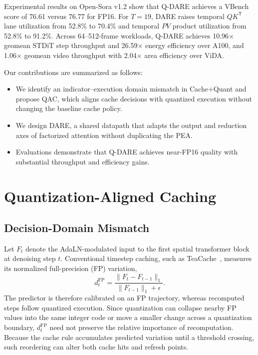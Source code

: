 \documentclass[conference]{IEEEtran}
\newcommand{\QDAREStepGeoA}{10.96}
\newcommand{\QDAREEnergyGeoA}{26.59}
\newcommand{\QDAREViDAThroughputGeo}{1.06}
\newcommand{\QDAREViDAAreaGeo}{2.04}
\begin{document}
Experimental results on Open-Sora v1.2 show that Q-DARE achieves
a VBench score of 76.61 versus 76.77 for FP16. For $T=19$, DARE raises temporal $QK^{\mathsf T}$ lane utilization from 52.8\% to 70.4\% and temporal $PV$ product utilization from 52.8\% to 91.2\%. Across 64--512-frame workloads, Q-DARE achieves \QDAREStepGeoA$\times$ geomean STDiT step throughput and \QDAREEnergyGeoA$\times$ energy efficiency over A100, and \QDAREViDAThroughputGeo$\times$ geomean video throughput with \QDAREViDAAreaGeo$\times$ area efficiency over ViDA.

Our contributions are summarized as follows:
\begin{itemize}
  \item We identify an indicator--execution domain mismatch in Cache+Quant and propose QAC, which aligns cache decisions with quantized execution without changing the baseline cache policy.
  \item We design DARE, a shared datapath that adapts the output and reduction axes of factorized attention without duplicating the PEA.
  \item Evaluations demonstrate that Q-DARE achieves near-FP16 quality with substantial throughput and efficiency gains.
\end{itemize}

\section{Quantization-Aligned Caching}
\label{sec:qac}

\subsection{Decision-Domain Mismatch}

Let $F_t$ denote the AdaLN-modulated input to the first spatial
transformer block at denoising step $t$.
Conventional timestep caching, such as TeaCache~\cite{liu2025teacache},
measures its normalized full-precision (FP) variation,
\begin{equation}
d_t^{\mathrm{FP}}=
\frac{\lVert F_t-F_{t-1}\rVert_1}
     {\lVert F_{t-1}\rVert_1+\epsilon}.
\label{eq:fp_indicator}
\end{equation}
The predictor is therefore calibrated on an FP trajectory, whereas
recomputed steps follow quantized execution.
Since quantization can collapse nearby FP values into the same integer
code or move a smaller change across a quantization boundary,
$d_t^{\mathrm{FP}}$ need not preserve the relative importance of
recomputation.
Because the cache rule accumulates predicted variation until a threshold
crossing, such reordering can alter both cache hits and refresh points.
\end{document}
